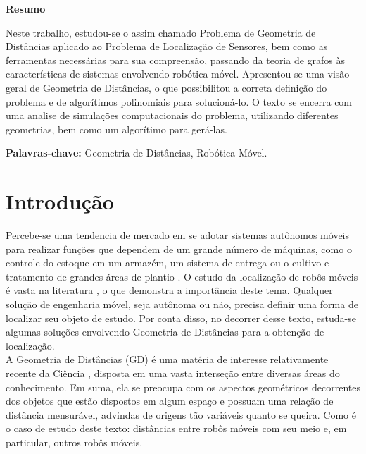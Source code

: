 \documentclass[a4paper,12pt]{report}
\begin{document}
	
	\vspace{2cm}	
	\begin{center}
		\large
		\textbf{Resumo}
	\end{center}
	
	Neste trabalho, estudou-se o assim chamado Problema de Geometria de Distâncias aplicado ao Problema de Localização de Sensores, bem como as ferramentas necessárias para sua compreensão, passando da teoria de grafos às características de sistemas envolvendo robótica móvel. Apresentou-se uma visão geral de Geometria de Distâncias, o que possibilitou a correta definição do problema e de algorítimos polinomiais para solucioná-lo. O texto se encerra com uma analise de simulações computacionais do problema, utilizando diferentes geometrias, bem como um algorítimo para gerá-las. 
	
	\textbf{Palavras-chave:} Geometria de Distâncias, Robótica Móvel.
	
	
	\newpage
	\chapter{Introdução}
	
	Percebe-se uma tendencia de mercado em se adotar sistemas autônomos móveis para realizar funções que dependem de um grande número de máquinas, como o controle do estoque em um armazém, um sistema de entrega ou o cultivo e tratamento de grandes áreas de plantio \cite{mobileRobotsCook}. O estudo da localização de robôs móveis é vasta na literatura \cite{eren2004rigidity, mobileRobotsTzafestas}, o que demonstra a importância deste tema. Qualquer solução de engenharia móvel, seja autônoma ou não, precisa definir uma forma de localizar seu objeto de estudo. Por conta disso, no decorrer desse texto, estuda-se algumas soluções envolvendo Geometria de Distâncias para a obtenção de localização.
	\\
	
	A Geometria de Distâncias (GD) é uma matéria de interesse relativamente recente da Ciência \cite{carlileGDandAplications}, disposta em uma vasta interseção entre diversas áreas do conhecimento. Em suma, ela se preocupa com os aspectos geométricos decorrentes dos objetos que estão dispostos em algum espaço e possuam uma relação de distância mensurável, advindas de origens tão variáveis quanto se queira. Como é o caso de estudo deste texto: distâncias entre robôs móveis com seu meio e, em particular, outros robôs móveis.
	\\
	
\end{document}
